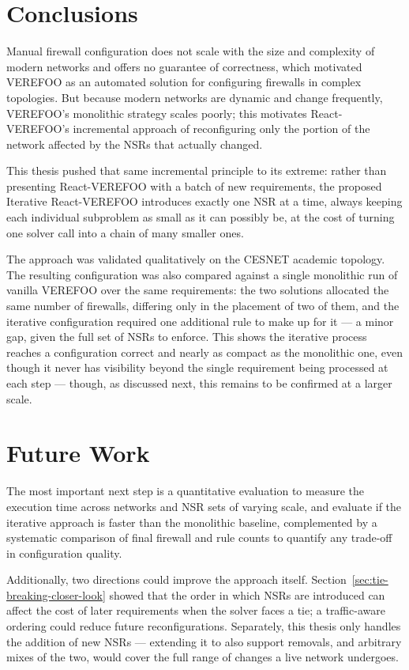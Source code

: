 
\section{Conclusions}

Manual firewall configuration does not scale with the size and complexity of modern networks and offers no guarantee of correctness, which motivated VEREFOO as an automated solution for configuring firewalls in complex topologies. But because modern networks are dynamic and change frequently, VEREFOO's monolithic strategy scales poorly; this motivates React-VEREFOO's incremental approach of reconfiguring only the portion of the network affected by the NSRs that actually changed.

This thesis pushed that same incremental principle to its extreme: rather than presenting React-VEREFOO with a batch of new requirements, the proposed Iterative React-VEREFOO introduces exactly one NSR at a time, always keeping each individual subproblem as small as it can possibly be, at the cost of turning one solver call into a chain of many smaller ones.

The approach was validated qualitatively on the CESNET academic topology. The resulting configuration was also compared against a single monolithic run of vanilla VEREFOO over the same requirements: the two solutions allocated the same number of firewalls, differing only in the placement of two of them, and the iterative configuration required one additional rule to make up for it — a minor gap, given the full set of NSRs to enforce. This shows the iterative process reaches a configuration correct and nearly as compact as the monolithic one, even though it never has visibility beyond the single requirement being processed at each step — though, as discussed next, this remains to be confirmed at a larger scale.

\section{Future Work}

The most important next step is a quantitative evaluation to measure the execution time across networks and NSR sets of varying scale, and evaluate if the iterative approach is faster than the monolithic baseline, complemented by a systematic comparison of final firewall and rule counts to quantify any trade-off in configuration quality.

Additionally, two directions could improve the approach itself. Section~\ref{sec:tie-breaking-closer-look} showed that the order in which NSRs are introduced can affect the cost of later requirements when the solver faces a tie; a traffic-aware ordering could reduce future reconfigurations. Separately, this thesis only handles the addition of new NSRs — extending it to also support removals, and arbitrary mixes of the two, would cover the full range of changes a live network undergoes.